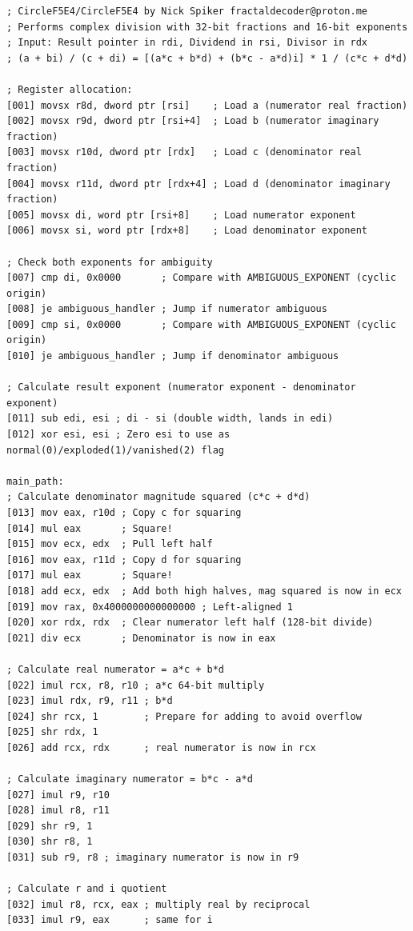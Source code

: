 \documentclass[12pt,letter]{article}
\begin{document}
\newpage
\begin{lstlisting}[style=rust, caption={Complete Complex Division Assembly Implementation}, label={fig:circle_divide}]
; CircleF5E4/CircleF5E4 by Nick Spiker fractaldecoder@proton.me
; Performs complex division with 32-bit fractions and 16-bit exponents
; Input: Result pointer in rdi, Dividend in rsi, Divisor in rdx
; (a + bi) / (c + di) = [(a*c + b*d) + (b*c - a*d)i] * 1 / (c*c + d*d)

; Register allocation:
[001] movsx r8d, dword ptr [rsi]    ; Load a (numerator real fraction)
[002] movsx r9d, dword ptr [rsi+4]  ; Load b (numerator imaginary fraction)
[003] movsx r10d, dword ptr [rdx]   ; Load c (denominator real fraction)
[004] movsx r11d, dword ptr [rdx+4] ; Load d (denominator imaginary fraction)
[005] movsx di, word ptr [rsi+8]    ; Load numerator exponent
[006] movsx si, word ptr [rdx+8]    ; Load denominator exponent

; Check both exponents for ambiguity
[007] cmp di, 0x0000       ; Compare with AMBIGUOUS_EXPONENT (cyclic origin)
[008] je ambiguous_handler ; Jump if numerator ambiguous
[009] cmp si, 0x0000       ; Compare with AMBIGUOUS_EXPONENT (cyclic origin)
[010] je ambiguous_handler ; Jump if denominator ambiguous

; Calculate result exponent (numerator exponent - denominator exponent)
[011] sub edi, esi ; di - si (double width, lands in edi)
[012] xor esi, esi ; Zero esi to use as normal(0)/exploded(1)/vanished(2) flag

main_path:
; Calculate denominator magnitude squared (c*c + d*d)
[013] mov eax, r10d ; Copy c for squaring
[014] mul eax       ; Square!
[015] mov ecx, edx  ; Pull left half
[016] mov eax, r11d ; Copy d for squaring
[017] mul eax       ; Square!
[018] add ecx, edx  ; Add both high halves, mag squared is now in ecx
[019] mov rax, 0x4000000000000000 ; Left-aligned 1
[020] xor rdx, rdx  ; Clear numerator left half (128-bit divide)
[021] div ecx       ; Denominator is now in eax

; Calculate real numerator = a*c + b*d
[022] imul rcx, r8, r10 ; a*c 64-bit multiply
[023] imul rdx, r9, r11 ; b*d
[024] shr rcx, 1        ; Prepare for adding to avoid overflow
[025] shr rdx, 1
[026] add rcx, rdx      ; real numerator is now in rcx

; Calculate imaginary numerator = b*c - a*d
[027] imul r9, r10
[028] imul r8, r11
[029] shr r9, 1
[030] shr r8, 1
[031] sub r9, r8 ; imaginary numerator is now in r9

; Calculate r and i quotient
[032] imul r8, rcx, eax ; multiply real by reciprocal
[033] imul r9, eax      ; same for i


\end{lstlisting}
\end{document}
